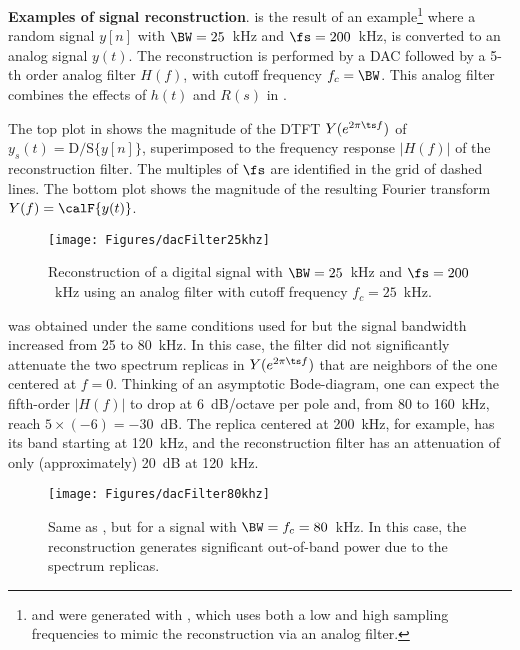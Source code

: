 \bExample \textbf{Examples of signal reconstruction}.
 is the result of an example\footnote{  and  were generated with , which uses both a low and high sampling frequencies to mimic the reconstruction via an analog filter.} where a random signal $y[n]$ with $\BW=25$~kHz and $\fs=200$~kHz, is converted to an analog signal $y(t)$. The reconstruction is performed by a DAC followed by a 5-th order analog filter $H(f)$, with cutoff frequency $f_c = \BW$.
This analog filter combines the effects of $h(t)$ and $R(s)$ in .

 The top plot in  shows the magnitude of the DTFT $Y(e^{2 \pi \ts f})$ of $y_s(t)=\textrm{D/S}\{y[n]\}$,  superimposed to the frequency response $|H(f)|$ of the reconstruction filter. The multiples of $\fs$ are identified in the grid of dashed lines. The bottom plot shows the magnitude of
the resulting Fourier transform $Y(f)=\calF \{ y(t) \}$.

\begin{figure}[htbp]
\centering
\texttt{[image: Figures/dacFilter25khz]}
\caption{Reconstruction of a digital signal with $\BW=25$~kHz and $\fs=200$~kHz using an analog filter with cutoff frequency $f_c = 25$~kHz.\label{fig:dacFilter25khz}}
\end{figure}

 was obtained under the same conditions used for  but the signal bandwidth increased from 25 to 80~kHz. In this case, the filter did not significantly attenuate the two spectrum replicas in $Y(e^{2 \pi \ts f})$ that are neighbors of the one centered at $f=0$.  Thinking of an asymptotic Bode-diagram, one can expect the
fifth-order $|H(f)|$ to drop at 6~dB/octave per pole and, from 80 to 160~kHz, reach $5 \times (-6)=-30$~dB. The replica centered at 200~kHz, for example, has its band starting at 120~kHz, and the reconstruction filter has an attenuation of only (approximately) 20~dB at 120~kHz. 

\begin{figure}[htbp]
\centering
\texttt{[image: Figures/dacFilter80khz]}
\caption[{Same as , but for a signal with $\BW=f_c=80$~kHz.}]{Same as , but for a signal with $\BW=f_c=80$~kHz. In this case, the reconstruction generates significant out-of-band power due to the spectrum replicas.\label{fig:dacFilter80khz}}
\end{figure}


